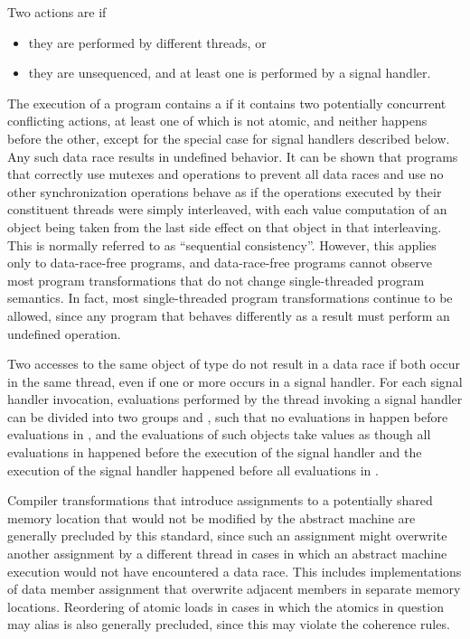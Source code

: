 \pnum
{}%
Two actions are  if
\begin{itemize}
\item they are performed by different threads, or
\item they are unsequenced, and at least one is performed by a signal handler.
\end{itemize}
%
The execution of a program contains a  if it contains two
potentially concurrent conflicting actions, at least one of which is not atomic,
and neither happens before the other,
except for the special case for signal handlers described below.
Any such data race results in undefined
behavior. \enternote It can be shown that programs that correctly use mutexes
and  operations to prevent all data races and use no
other synchronization operations behave as if the operations executed by their
constituent threads were simply interleaved, with each
%
value computation of an
object being taken from the last
%
side effect on that object in that
interleaving. This is normally referred to as ``sequential consistency''.
However, this applies only to data-race-free programs, and data-race-free
programs cannot observe most program transformations that do not change
single-threaded program semantics. In fact, most single-threaded program
transformations continue to be allowed, since any program that behaves
differently as a result must perform an undefined operation. \exitnote

\pnum
Two accesses to the same object of type  do not
result in a data race if both occur in the same thread, even if one or more
occurs in a signal handler. For each signal handler invocation, evaluations
performed by the thread invoking a signal handler can be divided into two
groups  and , such that no evaluations in
 happen before evaluations in , and the
evaluations of such  objects take values as though
all evaluations in  happened before the execution of the signal
handler and the execution of the signal handler happened before all evaluations
in .

\pnum
\enternote Compiler transformations that introduce assignments to a potentially
shared memory location that would not be modified by the abstract machine are
generally precluded by this standard, since such an assignment might overwrite
another assignment by a different thread in cases in which an abstract machine
execution would not have encountered a data race. This includes implementations
of data member assignment that overwrite adjacent members in separate memory
locations. Reordering of atomic loads in cases in which the atomics in question
may alias is also generally precluded, since this may violate the coherence
rules. \exitnote

